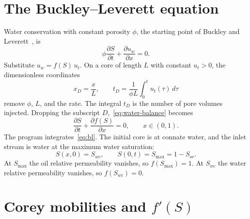 \documentclass[11pt]{article}
\begin{document}
\section{The Buckley--Leverett equation}

Water conservation with constant porosity $\phi$, the starting point of Buckley and Leverett~\cite{buckley1942}, is
\begin{equation}
\label{eq:water-balance}
\phi\frac{\partial S}{\partial t} + \frac{\partial u_w}{\partial x} = 0.
\end{equation}
Substitute $u_w = f(S)\, u_t$.
On a core of length $L$ with constant $u_t > 0$, the dimensionless coordinates
\begin{equation}
\label{eq:dimensionless}
x_D = \frac{x}{L},
\qquad
t_D = \frac{1}{\phi L}\int_0^t u_t(\tau)\,d\tau
\end{equation}
remove $\phi$, $L$, and the rate.
The integral $t_D$ is the number of pore volumes injected.
Dropping the subscript $D$,~\eqref{eq:water-balance} becomes
\begin{equation}
\label{eq:bl}
\frac{\partial S}{\partial t} + \frac{\partial f(S)}{\partial x} = 0,
\qquad x\in(0,1).
\end{equation}
The program integrates~\eqref{eq:bl}.
The initial core is at connate water, and the inlet stream is water at the maximum water saturation:
\begin{equation}
\label{eq:icbc}
S(x,0) = S_{wc},
\qquad
S(0,t) = S_{\max} = 1 - S_{or}.
\end{equation}
At $S_{\max}$ the oil relative permeability vanishes, so $f(S_{\max}) = 1$.
At $S_{wc}$ the water relative permeability vanishes, so $f(S_{wc}) = 0$.

\section{Corey mobilities and $f'(S)$}
\end{document}
